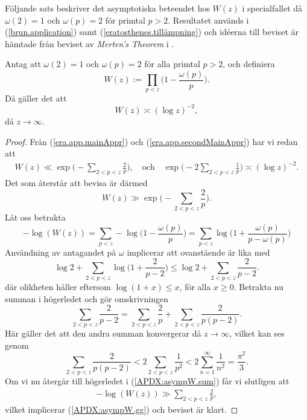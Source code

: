Följande sats beskriver det asymptotiska beteendet hos $W(z)$ i specialfallet då $\omega(2)=1$ och $\omega(p)=2$ för primtal $p>2$. 
Resultatet används i (\ref{brun.application}) samt (\ref{eratosthenes.tillämpning}) och idéerna till beviset är hämtade från beviset av \textit{Merten's Theorem} i \cite[kap 5.2]{cojocarumurty}.

\begin{theorem} \label{APDX:asympW}
Antag att $\omega(2)=1$ och $\omega(p)=2$ för alla primtal $p>2$, och definiera 
\begin{equation*}
    W(z):=\prod_{p<z}\biggl( 1-\frac{\omega(p)}{p} \biggr).   
\end{equation*}
Då gäller det att
\begin{equation} \label{APDX:asympW.main}
    W(z) \asymp (\log z)^{-2},
\end{equation}
då $z\to\infty$.
\end{theorem}


\begin{proof}
Från (\ref{era.app.mainAppr}) och (\ref{era.app.secondMainAppr}) har vi redan att
\begin{align*}
    W(z) \ll \exp \biggl( - \sum_{2 <p < z} \frac{2}{p}  \biggr),
    \quad\text{och}\quad
    \exp \biggl( - 2 \sum_{2 <p < z} \frac{1}{p}  \biggr) \asymp (\log z)^{-2}.
\end{align*}
Det som återstår att bevisa är därmed
\begin{equation} \label{APDX:asympW.gg}
    W(z) \gg \exp \biggl( - \sum_{2 <p < z} \frac{2}{p}  \biggr).
\end{equation}
Låt oss betrakta
\begin{equation*}
    -\log(W(z)) 
    = \sum_{p < z} -\log\biggl( 1-\frac{\omega(p)}{p} \biggr) 
    = \sum_{p < z} \log\biggl( 1+\frac{\omega(p)}{p-\omega(p)} \biggr)
\end{equation*}
Användning av antagandet på $\omega$ implicerar att ovanstående är lika med 
\begin{equation} \label{APDX:asympW.sum}
    \log 2 + \sum_{2<p<z} \log\biggl( 1+\frac{2}{p-2} \biggr)
    \leq \log 2 + \sum_{2<p<z} \frac{2}{p-2}.
\end{equation}
där olikheten håller eftersom $\log(1+x)\leq x$, för alla $x\geq0$. 
Betrakta nu summan i högerledet och gör omskrivningen
\begin{equation*}
    \sum_{2 <p < z} \frac{2}{p-2} = \sum_{2 <p < z} \frac{2}{p} + \sum_{2 <p < z} \frac{2}{p(p-2)}.
\end{equation*}
Här gäller det att den andra summan konvergerar då $z\to\infty$, vilket kan ses genom
\begin{equation*}
    \sum_{2 <p < z} \frac{2}{p(p-2)} < 2\sum_{2 <p < z} \frac{1}{p^2} < 2\sum_{n = 1}^\infty \frac{1}{n^2} = \frac{\pi^2}{3}.
\end{equation*}
Om vi nu återgår till högerledet i (\ref{APDX:asympW.sum}) får vi slutligen att
\begin{align*}
    -\log(W(z)) \gg \sum_{2 <p < z} \frac{2}{p},
\end{align*}
vilket implicerar (\ref{APDX:asympW.gg}) och beviset är klart.
\end{proof}